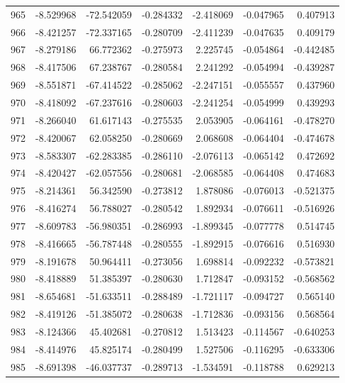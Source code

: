 \begin{tabular}{rrrrrrr}
 965 &  -8.529968 &  -72.542059 & -0.284332 &   -2.418069 &   -0.047965 &  0.407913 \\
 966 &  -8.421257 &  -72.337165 & -0.280709 &   -2.411239 &   -0.047635 &  0.409179 \\
 967 &  -8.279186 &   66.772362 & -0.275973 &    2.225745 &   -0.054864 & -0.442485 \\
 968 &  -8.417506 &   67.238767 & -0.280584 &    2.241292 &   -0.054994 & -0.439287 \\
 969 &  -8.551871 &  -67.414522 & -0.285062 &   -2.247151 &   -0.055557 &  0.437960 \\
 970 &  -8.418092 &  -67.237616 & -0.280603 &   -2.241254 &   -0.054999 &  0.439293 \\
 971 &  -8.266040 &   61.617143 & -0.275535 &    2.053905 &   -0.064161 & -0.478270 \\
 972 &  -8.420067 &   62.058250 & -0.280669 &    2.068608 &   -0.064404 & -0.474678 \\
 973 &  -8.583307 &  -62.283385 & -0.286110 &   -2.076113 &   -0.065142 &  0.472692 \\
 974 &  -8.420427 &  -62.057556 & -0.280681 &   -2.068585 &   -0.064408 &  0.474683 \\
 975 &  -8.214361 &   56.342590 & -0.273812 &    1.878086 &   -0.076013 & -0.521375 \\
 976 &  -8.416274 &   56.788027 & -0.280542 &    1.892934 &   -0.076611 & -0.516926 \\
 977 &  -8.609783 &  -56.980351 & -0.286993 &   -1.899345 &   -0.077778 &  0.514745 \\
 978 &  -8.416665 &  -56.787448 & -0.280555 &   -1.892915 &   -0.076616 &  0.516930 \\
 979 &  -8.191678 &   50.964411 & -0.273056 &    1.698814 &   -0.092232 & -0.573821 \\
 980 &  -8.418889 &   51.385397 & -0.280630 &    1.712847 &   -0.093152 & -0.568562 \\
 981 &  -8.654681 &  -51.633511 & -0.288489 &   -1.721117 &   -0.094727 &  0.565140 \\
 982 &  -8.419126 &  -51.385072 & -0.280638 &   -1.712836 &   -0.093156 &  0.568564 \\
 983 &  -8.124366 &   45.402681 & -0.270812 &    1.513423 &   -0.114567 & -0.640253 \\
 984 &  -8.414976 &   45.825174 & -0.280499 &    1.527506 &   -0.116295 & -0.633306 \\
 985 &  -8.691398 &  -46.037737 & -0.289713 &   -1.534591 &   -0.118788 &  0.629213 \\

\end{tabular}
